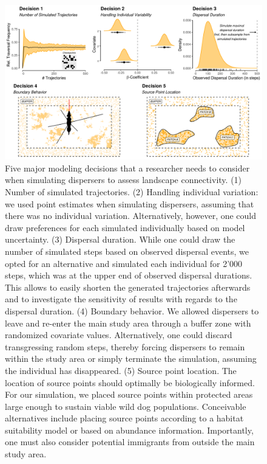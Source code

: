 \documentclass[abstract=on,10pt,a4paper,bibliography=totocnumbered]{article}
\begin{document}
\begin{figure}
  \includegraphics[width=\textwidth]{99_ModelingDecisions.png}
  \caption{Five major modeling decisions that a researcher needs to consider
  when simulating dispersers to assess landscape connectivity. (1) Number of
  simulated trajectories. (2) Handling individual variation: we used point
  estimates when simulating dispersers, assuming that there was no individual
  variation. Alternatively, however, one could draw preferences for each
  simulated individually based on model uncertainty. (3) Dispersal duration.
  While one could draw the number of simulated steps based on observed dispersal
  events, we opted for an alternative and simulated each individual for 2'000
  steps, which was at the upper end of observed dispersal durations. This allows
  to easily shorten the generated trajectories afterwards and to investigate the
  sensitivity of results with regards to the dispersal duration. (4) Boundary
  behavior. We allowed dispersers to leave and re-enter the main study area
  through a buffer zone with randomized covariate values. Alternatively, one
  could discard transgressing random steps, thereby forcing dispersers to remain
  within the study area or simply terminate the simulation, assuming the
  individual has disappeared. (5) Source point location. The location of source
  points should optimally be biologically informed. For our simulation, we
  placed source points within protected areas large enough to sustain viable
  wild dog populations. Conceivable alternatives include placing source points
  according to a habitat suitability model or based on abundance information.
  Importantly, one must also consider potential immigrants from outside the main
  study area.}
  \label{ModelingDecisions}
\end{figure}
\end{document}
